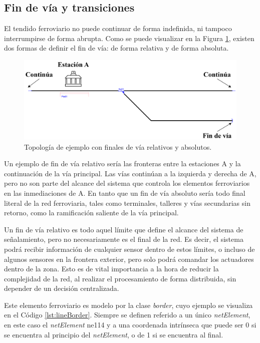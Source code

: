 \subsection{Fin de vía y transiciones}
    \label{sec:bufferstop}

    El tendido ferroviario no puede continuar de forma indefinida, ni tampoco interrumpirse de forma abrupta. Como se puede visualizar en la Figura \ref{fig:frontera_1}, existen dos formas de definir el fin de vía: de forma relativa y de forma absoluta.

    \begin{figure}[H]
        \centering
        \includegraphics[width=1\textwidth]{Figuras/border}
        \centering\caption{Topología de ejemplo con finales de vía relativos y absolutos.}
        \label{fig:frontera_1}
    \end{figure}

    Un ejemplo de fin de vía relativo sería las fronteras entre la estaciones A y la continuación de la vía principal. Las vías continúan a la izquierda y derecha de A, pero no son parte del alcance del sistema que controla los elementos ferroviarios en las inmediaciones de A. En tanto que un fin de vía absoluto sería todo final literal de la red ferroviaria, tales como terminales, talleres y vías secundarias sin retorno, como la ramificación saliente de la vía principal.
    
    Un fin de vía relativo es todo aquel límite que define el alcance del sistema de señalamiento, pero no necesariamente es el final de la red. Es decir, el sistema podrá recibir información de cualquier sensor dentro de estos límites, o incluso de algunos sensores en la frontera exterior, pero solo podrá comandar los actuadores dentro de la zona. Esto es de vital importancia a la hora de reducir la complejidad de la red, al realizar el procesamiento de forma distribuida, sin depender de un decisión centralizada.

    Este elemento ferroviario es modelo por la clase \textit{border}, cuyo ejemplo se visualiza en el Código \ref{lst:lineBorder}. Siempre se definen referido a un único \textit{netElement}, en este caso el \textit{netElement} ne114 y a una coordenada intrínseca que puede ser 0 si se encuentra al principio del \textit{netElement}, o de 1 si se encuentra al final.

